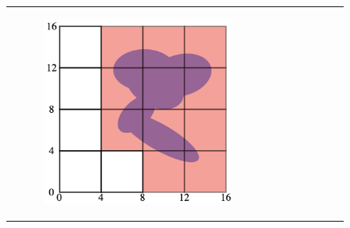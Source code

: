 \begin{figure}[H]
\begin{center}
\begin{tabular}{cc}

    \begin{subfigure}{0.4\textwidth}
    \begin{center}
    \includegraphics[width=\linewidth]{chapters/chapter2/img/motionPlanning/OGMlowres.png}
    \caption{}
    \label{subfig:OGM_A}
    \end{center}
    \end{subfigure}
    &
    \begin{subfigure}{0.4\textwidth}
    \begin{center}

\end{center}
\end{subfigure}
\end{tabular}
\end{center}
\end{figure}
